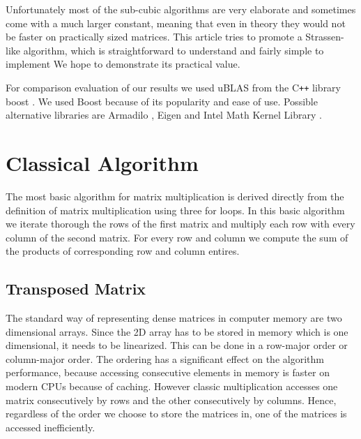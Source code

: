 \documentclass[a4paper,11pt]{article}
\newcommand{\cpp}{C\texttt{++} }
\begin{document}
Unfortunately most of the sub-cubic algorithms are very elaborate 
and sometimes come with a much larger constant, meaning that even in theory they would not be faster on practically sized matrices.
This article tries to promote a Strassen-like algorithm, which is
straightforward to understand and fairly simple to implement
We hope to demonstrate its practical value.


For comparison evaluation of our results we used uBLAS from the \cpp library boost \cite{boost}. We used Boost because of its popularity and ease of use.
Possible alternative libraries are Armadilo \cite{armadillo}, Eigen \cite{eigen} and Intel Math Kernel Library \cite{mkl}.

\section{Classical Algorithm}
The most basic algorithm for matrix multiplication is derived directly from the definition of matrix multiplication using three for loops.
In this basic algorithm we iterate thorough the rows of the first matrix and multiply each row with every column of the second matrix. For every row and column we compute the sum of the products of corresponding row and column entires.

\subsection{Transposed Matrix}
\label{classic_transposed}
The standard way of representing dense matrices in computer memory are two dimensional arrays. Since the 2D array has to be stored in memory which is one dimensional, it needs to be linearized. This can be done in a row-major order or column-major order\cite{Knuth1997}. The ordering has a significant effect on the algorithm performance, because accessing consecutive elements in memory is faster on modern CPUs because of caching. However classic multiplication accesses one matrix consecutively by rows and the other consecutively by columns. Hence, regardless of the order we choose to store the matrices in, one of the matrices is accessed inefficiently.
\end{document}
